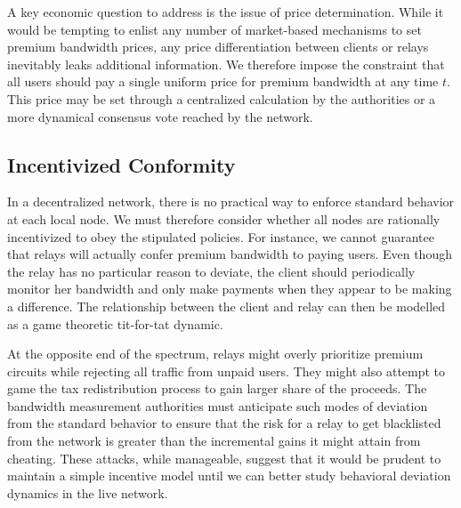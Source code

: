 A key economic question to address is the issue of price
determination. While it would be tempting to enlist any number of
market-based mechanisms to set premium bandwidth prices, any price
differentiation between clients or relays inevitably leaks additional
information.  We therefore impose the constraint that all users should
pay a single uniform price for premium bandwidth at any time $t$. This
price may be set through a centralized calculation by the authorities
or a more dynamical consensus vote reached by the network.

\subsection{Incentivized Conformity} In a decentralized network, there is no
practical way to enforce standard behavior at each local node. We must therefore
consider whether all nodes are rationally incentivized to obey the stipulated
policies. For instance, we cannot guarantee that relays will actually confer
premium bandwidth to paying users. Even though the relay has no particular
reason to deviate, the client should periodically monitor her bandwidth and only
make payments when they appear to be making a difference. The relationship
between the client and relay can then be modelled as a game theoretic tit-for-tat
dynamic.

At the opposite end of the spectrum, relays might overly prioritize premium
circuits while rejecting all traffic from unpaid users. They might also attempt
to game the tax redistribution process to gain larger share of the proceeds. The
bandwidth measurement authorities must anticipate such modes of deviation from
the standard behavior to ensure that the risk for a relay to get blacklisted
from the network is greater than the incremental gains it might attain from
cheating. These attacks, while manageable, suggest that it would be prudent to
maintain a simple incentive model until we can better study behavioral deviation
dynamics in the live network.

